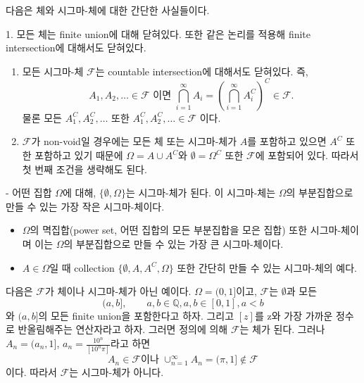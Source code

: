 \documentclass[b5paper,]{book}
\theoremstyle{definition}
\theoremstyle{definition}
\theoremstyle{definition}
\theoremstyle{remark}
\let\BeginKnitrBlock\begin \let\EndKnitrBlock\end
\begin{document}
다음은 체와 시그마-체에 대한 간단한 사실들이다.

\BeginKnitrBlock{corollary}[시그마-체에 대한 사실들]
\protect\hypertarget{cor:unnamed-chunk-18}{}{\label{cor:unnamed-chunk-18}
{} }1. 모든 체는 finite union에
대해 닫혀있다. 또한 같은 논리를 적용해 finite intersection에 대해서도
닫혀있다.

\begin{enumerate}
\def\labelenumi{\arabic{enumi}.}
\setcounter{enumi}{1}
\item
  모든 시그마-체 \(\mathcal{F}\)는 countable intersection에 대해서도
  닫혀있다. 즉,
  \[A_{1}, A_{2}, \ldots  \in \mathcal{F} \text{ 이면 }  \bigcap_{i=1}^{\infty}A_{i} = (\bigcap_{i=1}^{\infty}A_{i}^{C})^{C} \in \mathcal{F}.\]
  물론 모든 \(A_{1}^{C}, A_{2}^{C},\ldots\) 또한
  \(A_{1}^{C}, A_{2}^{C}, \ldots \in \mathcal{F}\) 이다.
\item
  \(\mathcal{F}\)가 non-void일 경우에는 모든 체 또는 시그마-체가 \(A\)를
  포함하고 있으면 \(A^{C}\) 또한 포함하고 있기 때문에
  \(\Omega=A \cup A^{C}\)와 \(\emptyset=\Omega^{C}\) 또한
  \(\mathcal{F}\)에 포함되어 있다. 따라서 첫 번째 조건을 생략해도 된다.
\end{enumerate}
\EndKnitrBlock{corollary}

\BeginKnitrBlock{example}[시그마-체의 예]
\protect\hypertarget{exm:unnamed-chunk-19}{}{\label{exm:unnamed-chunk-19}
{} }- 어떤 집합 \(\Omega\)에 대해,
\(\{\emptyset, \Omega\}\)는 시그마-체가 된다. 이 시그마-체는
\(\Omega\)의 부분집합으로 만들 수 있는 가장 작은 시그마-체이다.

\begin{itemize}
\item
  \(\Omega\)의 멱집합(power set, 어떤 집합의 모든 부분집합을 모은 집합)
  또한 시그마-체이며 이는 \(\Omega\)의 부분집합으로 만들 수 있는 가장 큰
  시그마-체이다.
\item
  \(A\in\Omega\)일 때 collection \(\{\emptyset, A, A^{C}, \Omega\}\)
  또한 간단히 만들 수 있는 시그마-체의 예다.
\end{itemize}
\EndKnitrBlock{example}

\BeginKnitrBlock{example}[체이나 시그마-체가 아닌 예]
\protect\hypertarget{exm:unnamed-chunk-20}{}{\label{exm:unnamed-chunk-20}
{} }다음은 \(\mathcal{F}\)가
체이나 시그마-체가 아닌 예이다. \(\Omega=(0,1]\)이고, \(\mathcal{F}\)는
\(\emptyset\)과 모든
\[(a,b], \qquad{a,b\in\mathbb{Q}, a,b\in [0,1], a<b}\] 와 \((a,b]\)의
모든 finite union을 포함한다고 하자. 그리고 \([z]\)를 z와 가장 가까운
정수로 반올림해주는 연산자라고 하자. 그러면 정의에 의해
\(\mathcal{F}\)는 체가 된다. 그러나 \(A_{n}=(a_{n},1]\),
\(a_{n}=\frac{10^{n}}{[10^{n}\pi]}\)라고 하면
\[A_{n}\in\mathcal{F} \text{이나 } \cup_{n=1}^{\infty}A_{n}=(\pi,1]\notin \mathcal{F}\]
이다. 따라서 \(\mathcal{F}\)는 시그마-체가 아니다.
\EndKnitrBlock{example}
\end{document}
